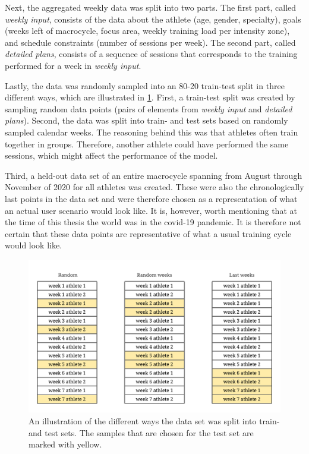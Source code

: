 Next, the aggregated weekly data was split into two parts.
The first part, called \textit{weekly input}, consists of the data about the athlete (age, gender, specialty), goals (weeks left of macrocycle, focus area, weekly training load per intensity zone), and schedule constraints (number of sessions per week).
The second part, called \textit{detailed plans}, consists of a sequence of sessions that corresponds to the training performed for a week in \textit{weekly input}.

Lastly, the data was randomly sampled into an 80-20 train-test split in three different ways, which are illustrated in \cref{fig:random_splits}.
First, a train-test split was created by sampling random data points (pairs of elements from \textit{weekly input} and \textit{detailed plans}).
Second, the data was split into train- and test sets based on randomly sampled calendar weeks.
The reasoning behind this was that athletes often train together in groups. 
Therefore, another athlete could have performed the same sessions, which might affect the performance of the model.

Third, a held-out data set of an entire macrocycle spanning from August through November of 2020 for all athletes was created.
These were also the chronologically last points in the data set and were therefore chosen as a representation of what an actual user scenario would look like.
It is, however, worth mentioning that at the time of this thesis the world was in the covid-19 pandemic. 
It is therefore not certain that these data points are representative of what a usual training cycle would look like.

\begin{figure}[ht]
    \centering
    \includegraphics[width=\textwidth]{chapters/figures/implementation_plots/random_split_illustration.pdf}
    \caption{An illustration of the different ways the data set was split into train- and test sets. The samples that are chosen for the test set are marked with yellow.}
    \label{fig:random_splits}
\end{figure}

